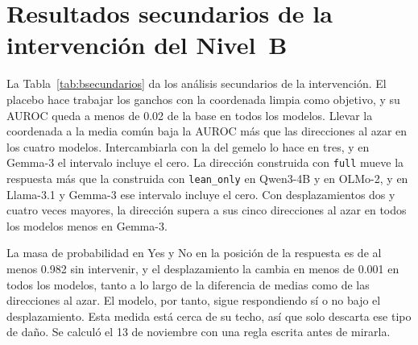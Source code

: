 \documentclass[10pt]{article}
\newcommand{\vr}[1]{\texttt{#1}}
\begin{document}
\section{Resultados secundarios de la intervención del Nivel~B}\label{app:intervencion}

La Tabla~\ref{tab:bsecundarios} da los análisis secundarios de la intervención. El placebo hace trabajar los ganchos
con la coordenada limpia como objetivo, y su AUROC queda a menos de 0.02 de la base en todos los modelos. Llevar la
coordenada a la media común baja la AUROC más que las direcciones al azar en los cuatro modelos. Intercambiarla con la
del gemelo lo hace en tres, y en Gemma-3 el intervalo incluye el cero. La dirección construida con \vr{full} mueve
la respuesta más que la construida con \vr{lean\_only} en Qwen3-4B y en OLMo-2, y en Llama-3.1 y Gemma-3 ese intervalo
incluye el cero. Con desplazamientos dos y cuatro veces mayores, la dirección supera a sus cinco direcciones al azar
en todos los modelos menos en Gemma-3.

La masa de probabilidad en Yes y No en la posición de la respuesta es de al menos 0.982 sin intervenir, y el
desplazamiento la cambia en menos de 0.001 en todos los modelos, tanto a lo largo de la diferencia de medias como de
las direcciones al azar. El modelo, por tanto, sigue respondiendo sí o no bajo el desplazamiento. Esta medida está
cerca de su techo, así que solo descarta ese tipo de daño. Se calculó el 13 de noviembre con una regla escrita antes
de mirarla.
\end{document}
